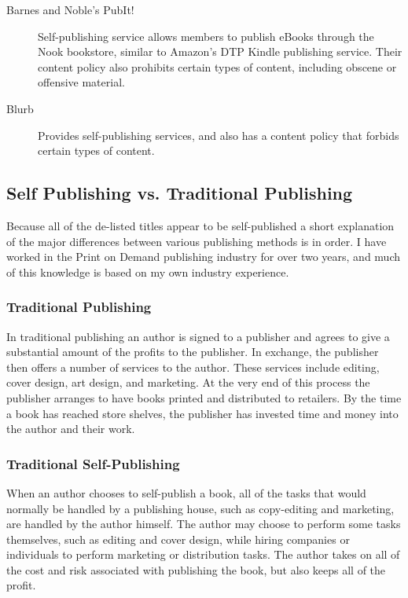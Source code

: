 \documentclass[11pt]{article}
\begin{document}
\begin{multicols}{2}
\begin{description}
   \item[Barnes and Noble's PubIt!] Self-publishing service allows members to publish eBooks through the Nook bookstore, similar to Amazon's DTP Kindle publishing service.  Their content policy also prohibits certain types of content, including obscene or offensive material.  \cite[Select Service Policies, then Content Policy]{PubItContentPolicy}

   \item[Blurb] Provides self-publishing services, and also has a content policy that forbids certain types of content. \cite{BlurbEULA}
   \end{description}

\subsection{Self Publishing vs. Traditional Publishing}

Because all of the de-listed titles appear to be self-published a short explanation of the major differences between various publishing methods is in order.  I have worked in the Print on Demand publishing industry for over two years, and much of this knowledge is based on my own industry experience.

\subsubsection{Traditional Publishing}

In traditional publishing an author is signed to a publisher and agrees to give a substantial amount of the profits to the publisher.  In exchange, the publisher then offers a number of services to the author.  These services include editing, cover design, art design, and marketing. \cite{WhatPublisherDoes}  At the very end of this process the publisher arranges to have books printed and distributed to retailers. \cite{WhatPublisherDoes}  By the time a book has reached store shelves, the publisher has invested time and money into the author and their work. 

\subsubsection{Traditional Self-Publishing}

When an author chooses to self-publish a book, all of the tasks that would normally be handled by a publishing house, such as copy-editing and marketing, are handled by the author himself.  The author may choose to perform some tasks themselves, such as editing and cover design, while hiring companies or individuals to perform marketing or distribution tasks. The author takes on all of the cost and risk associated with publishing the book, but also keeps all of the profit.


\end{multicols}
\end{document}
